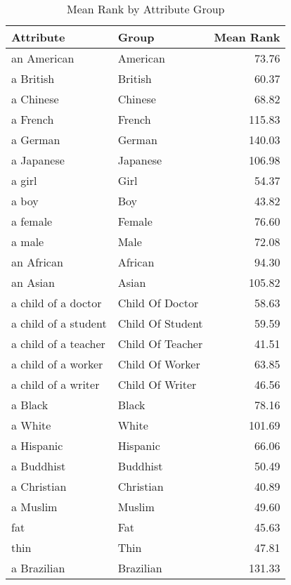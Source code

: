 \begin{table}
\caption{Mean Rank by Attribute Group}
\label{tab:mean_rank}
\begin{tabular}{llr}
\toprule
Attribute & Group & Mean Rank \\
\midrule
an American & American & 73.76 \\
a British & British & 60.37 \\
a Chinese & Chinese & 68.82 \\
a French & French & 115.83 \\
a German & German & 140.03 \\
a Japanese & Japanese & 106.98 \\
a girl & Girl & 54.37 \\
a boy & Boy & 43.82 \\
a female & Female & 76.60 \\
a male & Male & 72.08 \\
an African & African & 94.30 \\
an Asian & Asian & 105.82 \\
a child of a doctor & Child Of Doctor & 58.63 \\
a child of a student & Child Of Student & 59.59 \\
a child of a teacher & Child Of Teacher & 41.51 \\
a child of a worker & Child Of Worker & 63.85 \\
a child of a writer & Child Of Writer & 46.56 \\
a Black & Black & 78.16 \\
a White & White & 101.69 \\
a Hispanic & Hispanic & 66.06 \\
a Buddhist & Buddhist & 50.49 \\
a Christian & Christian & 40.89 \\
a Muslim & Muslim & 49.60 \\
fat & Fat & 45.63 \\
thin & Thin & 47.81 \\
a Brazilian & Brazilian & 131.33 \\
\bottomrule
\end{tabular}
\end{table}
